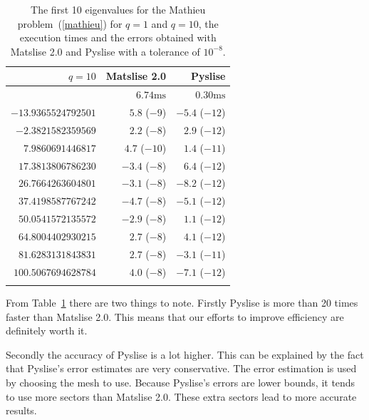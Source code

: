 \begin{table}
  \begin{center}
    \begin{tabular}[]{rrr}
      \toprule
      $q=10$              & Matslise 2.0    & Pyslise         \\
      \midrule
                          & $6.74\text{ms}$ & $0.30\text{ms}$ \\
      $-13.9365524792501$ & $5.8$ ($-9$)    & $-5.4$ ($-12$)  \\
      $-2.3821582359569$  & $2.2$ ($-8$)    & $2.9$ ($-12$)   \\
      $7.9860691446817$   & $4.7$ ($-10$)   & $1.4$ ($-11$)   \\
      $17.3813806786230$  & $-3.4$ ($-8$)   & $6.4$ ($-12$)   \\
      $26.7664263604801$  & $-3.1$ ($-8$)   & $-8.2$ ($-12$)  \\
      $37.4198587767242$  & $-4.7$ ($-8$)   & $-5.1$ ($-12$)  \\
      $50.0541572135572$  & $-2.9$ ($-8$)   & $1.1$ ($-12$)   \\
      $64.8004402930215$  & $2.7$ ($-8$)    & $4.1$ ($-12$)   \\
      $81.6283131843831$  & $2.7$ ($-8$)    & $-3.1$ ($-11$)  \\
      $100.5067694628784$ & $4.0$ ($-8$)    & $-7.1$ ($-12$)  \\
                          &                 &                 \\
      \bottomrule
    \end{tabular}
  \end{center}
  \caption{\label{tab:c2_tab1}The first 10 eigenvalues for the Mathieu problem~(\ref{mathieu}) for $q=1$ and $q=10$, the execution times and the errors obtained with Matslise 2.0 and Pyslise with a tolerance of $10^{-8}$.  }
\end{table}

From Table~\ref{tab:c2_tab1} there are two things to note. Firstly Pyslise is
more than 20 times faster than Matslise 2.0. This means that our efforts to
improve efficiency are definitely worth it.

Secondly the accuracy of Pyslise is a lot higher. This can be explained
by the fact that Pyslise's error estimates are very conservative. The
error estimation is used by choosing the mesh to use. Because Pyslise's
errors are lower bounds, it tends to use more sectors than Matslise 2.0.
These extra sectors lead to more accurate results.



